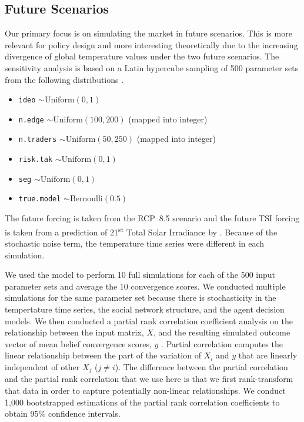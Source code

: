 \documentclass{wscpaperproc}\usepackage[]{graphicx}\usepackage[]{color}
\begin{document}
\subsection{Future Scenarios}



Our primary focus is on simulating the market in future scenarios. This is more relevant for policy design and more interesting theoretically due to the increasing divergence of global temperature values under the two future scenarios. The sensitivity analysis is based on a Latin hypercube sampling of 500 parameter sets from the following distributions .

\begin{itemize}
  \item \texttt{ideo} $\sim \text{Uniform}(0,1)$
  \item \texttt{n.edge} $\sim \text{Uniform}(100,200)$ (mapped into integer)
  \item \texttt{n.traders} $\sim \text{Uniform}(50,250)$ (mapped into integer)
  \item \texttt{risk.tak}  $\sim \text{Uniform}(0,1)$
  \item \texttt{seg} $\sim \text{Uniform}(0,1)$
  \item \texttt{true.model} $\sim \text{Bernoulli}(0.5)$
\end{itemize}

The future  forcing is taken from the RCP~8.5 scenario  and the future TSI forcing is taken from a prediction of 21\textsuperscript{st} Total Solar Irradiance by . Because of the stochastic noise term, the temperature time series were different in each simulation.

We used the model to perform 10 full simulations for each of the 500 input parameter sets and average the 10 convergence scores. We conducted multiple simulations for the same parameter set because there is stochasticity in the tempertature time series, the social network structure, and the agent decision models. We then conducted a partial rank correlation coefficient analysis on the relationship between the input matrix, $X$, and the resulting simulated outcome vector of mean belief convergence scores, $y$ . Partial correlation computes the linear relationship between the part of the variation of $X_i$ and $y$ that are linearly independent of other $X_j$  ($j \neq i$).  The difference between the partial correlation and the partial rank correlation that we use here is that we first rank-transform that data in order to capture potentially non-linear relationships. We conduct 1,000 bootstrapped estimations of the partial rank correlation coefficients to obtain 95\% confidence intervals.
\end{document}
